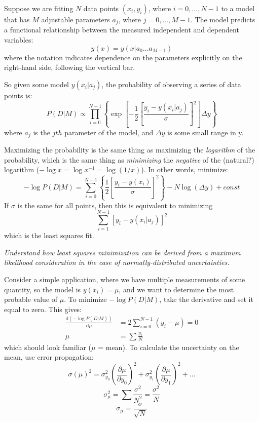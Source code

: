 \documentclass{article}
\newcommand{\test}[1]{%
    \begin{center}
        \colorbox{hl}{\parbox{0.9\textwidth}{\emph{\centering #1}}}
    \end{center}}
\begin{document}
Suppose we are fitting $N$ data points $(x_i,y_i)$, where $i=0,\ldots,N-1$
to a model
that has $M$ adjustable parameters $a_j$, where $j=0,\ldots,M-1$.
The model predicts a functional relationship between the measured
independent and dependent variables:
$$ y(x) = y(x|a_0 \ldots a_{M-1}) $$
where the notation indicates dependence on the parameters explicitly on the
right-hand side, following the vertical bar.

So given some model $y(x_i|a_j)$, the probability of observing a
series of data points is:{$$
    P(D|M) \propto \prod^{N-1}_{i=0}\left\{\exp
    \left[-\frac{1}{2}\left[\frac{y_i-y(x_i|a_j)}
    {\sigma}\right]^{2}\right]\Delta y \right\}
$$}where $a_j$ is the $jth$ parameter of the model, and $\Delta y$ is some small
range in y.

Maximizing the probability is the same thing as
maximizing the \emph{logarithm} of the probability, which is the same thing as
\emph{minimizing} the \emph{negative} of the (natural?) logarithm
($-\log{x} = \log{x^{-1}} = \log(1/x)$).
In other words, minimize:{$$
    -\log P(D|M) = \sum^{N-1}_{i=0}\left\{\frac{1}{2}\left[
    \frac{y_i-y(x_i)}{\sigma}\right]^2\right\}
    -N\log(\Delta y) + const
$$}
If $\sigma$ is the same for all points, then this is equivalent to minimizing
$$ \sum^{N-1}_{i=1}\left[y_i-y\left(x_{i}|a_{j}\right)\right]^{2} $$
which is the least squares fit.

\test{Understand how least squares minimization can be derived from a maximum
    likelihood consideration in the case of normally-distributed
    uncertainties.}

Consider a simple application, where we have multiple measurements of some
quantity, so the model is $y(x_{i}) = \mu$, and we want to determine the
most probable value of $\mu$. To minimize $-\log{P(D|M)}$, take the
derivative and set it equal to zero. This gives:
\begin{align*}
    \frac{\mathrm{d}(-\log P(D|M))}{\mathrm{d}\mu}
    &= 2\sum^{N-1}_{i=0}(y_i-\mu) = 0 \\[1ex]
    \mu &= \sum \frac{y_i}{N}
\end{align*}
which should look familiar ($\mu$ = mean).
To calculate the uncertainty on the mean,
use error propagation:
$$  \sigma(\mu)^2 = \sigma_{y_0}^2
    \left( \frac{\partial{\mu}}{\partial{y}_0}\right)^2
    + \sigma_{y_1}^2
    \left( \frac{\partial{\mu}}{\partial{y}_1}\right)^2
    + \ldots $$
$$  \sigma_{\mu}^{2} = \sum\frac{\sigma^{2}}{N^{2}} = \frac{\sigma^{2}}{N}$$
$$  \sigma_{\mu} = \frac{\sigma}{\sqrt{N}} $$
\end{document}
